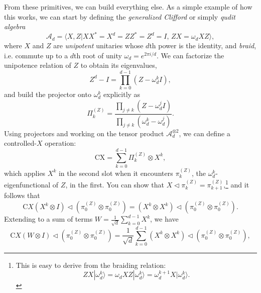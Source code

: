 From these primitives, we can build everything else.
As a simple example of how this works, we can start by defining the
\emph{generalized Clifford} or simply \emph{qudit algebra}
\begin{equation}
  \mathcal{A}_d = \langle X, Z | XX^* = X^d = ZZ^* = Z^d = I, \, ZX =
 \omega_d XZ\rangle,\label{eq:pres-qudit}
\end{equation}
where $X$ and $Z$ are \emph{unipotent} unitaries whose $d$th power is
the identity, and \emph{braid}, i.e. commute
up to a $d$th root of unity $\omega_d = e^{2\pi i /d}$.
We can factorize the unipotence relation of $Z$ to obtain its eigenvalues,
\[
  Z^d - I = \prod_{k=0}^{d-1} (Z - \omega_d^k I),
\]
and build the projector onto $\omega_d^k$ explicitly as
\[
  \Pi_{k}^{(Z)} = \frac{\prod_{j\neq k}(Z - \omega_d^j
    I)}{\prod_{j\neq k}(\omega_d^k - \omega_d^j)}.
\]
Using projectors and working on the tensor product
$\mathcal{A}_d^{\otimes 2}$, we can define a controlled-$X$ operation:
\[
  \text{CX} = \sum_{k=0}^{d-1} \Pi_{k}^{(Z)} \otimes X^k,
\]
which applies $X^k$ in the second slot when it encounters $\pi^{(Z)}_k$, the
$\omega_d^k$-eigenfunctional of $Z$, in the first.
You can show that $X \triangleleft \pi^{(Z)}_k =
\pi^{(Z)}_{k+1}$,\footnote{This is easy to derive from the braiding
  relation: \[
    ZX |\omega_d^k\rangle = \omega_d X Z |\omega_d^k\rangle =
    \omega_d^{k+1} X |\omega_d^k\rangle.
  \]} and it follows that
\[
  \text{C}X (X^k \otimes I) \triangleleft (\pi^{(Z)}_0 \otimes
  \pi^{(Z)}_0) = (X^k \otimes X^k) \triangleleft (\pi^{(Z)}_0 \otimes
  \pi^{(Z)}_0).
\]
Extending to a sum of terms $W = \frac{1}{\sqrt{d}}\sum_{k=0}^{d-1}
X^k$, we have
\[
    \text{C}X \left(W\otimes I\right) \triangleleft (\pi^{(Z)}_0 \otimes
  \pi^{(Z)}_0) = \frac{1}{\sqrt{d}}\sum_{k=0}^{d-1}\left(X^k \otimes X^k\right) \triangleleft (\pi^{(Z)}_0 \otimes
  \pi^{(Z)}_0),
\]
